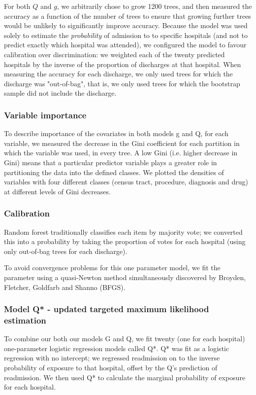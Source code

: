 \documentclass[]{article}\usepackage[]{graphicx}\usepackage[]{color}
\begin{document}
For both $Q$ and $g$, we arbitrarily chose to grow 1200 trees, and then measured the accuracy as a function of the number of trees to ensure that growing further trees would be unlikely to significantly improve accuracy. Because the model was used solely to estimate the \emph{probability} of admission to to specific hospitals (and not to predict exactly which hospital was attended), we configured the model to favour calibration over discrimination: we weighted each of the twenty predicted hospitals by the inverse of the proportion of discharges at that hospital. When measuring the accuracy for each discharge, we only used trees for which the discharge was "out-of-bag", that is, we only used trees for which the bootstrap sample did not include the discharge.

\subsubsection{Variable importance}
To describe importance of the covariates in both models g and Q, for each variable, we measured the decrease in the Gini coefficient for each partition in which the variable was used, in every tree. A low Gini (i.e. higher decrease in Gini) means that a particular predictor variable plays a greater role in partitioning the data into the defined classes. We plotted the densities of variables with four different classes (census tract, procedure, diagnosis and drug) at different levels of Gini decreases.

\subsubsection{Calibration}
Random forest traditionally classifies each item by majority vote; we converted this into a probability by taking the proportion of votes for each hospital (using only out-of-bag trees for each discharge).

To avoid convergence problems for this one parameter model, we fit the parameter using a quasi-Newton method simultaneously discovered by Broyden\supercite{broyden_convergence_1970}, Fletcher\supercite{fletcher_new_1970}, Goldfarb\supercite{goldfarb_family_1970} and Shanno\supercite{shanno_conditioning_1970} (BFGS).

\subsubsection{Model Q* - updated targeted maximum likelihood estimation}
To combine our both our models G and Q, we fit twenty (one for each hospital) one-parameter logistic regression models called Q*. Q* was fit as a logistic regression with no intercept; we regressed readmission on to the inverse probability of exposure to that hospital, offset by the Q's prediction of readmission. We then used Q* to calculate the marginal probability of exposure for each hospital.
\end{document}
